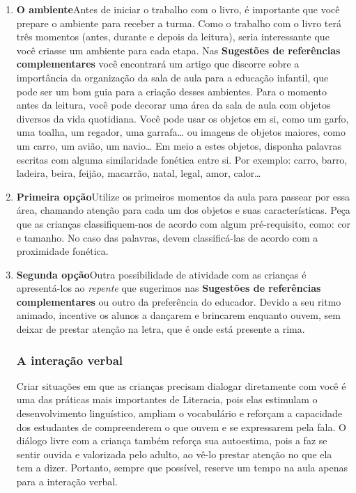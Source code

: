 \documentclass[11pt]{extarticle}
\begin{document}
\begin{enumerate}
\item \textbf{O ambiente}\quad Antes de iniciar o trabalho com o livro, é importante que você 
prepare o ambiente para receber a turma. Como o trabalho com o livro terá 
três momentos (antes, durante e depois da leitura), seria interessante que você 
criasse um ambiente para cada etapa. Nas \textbf{Sugestões de referências complementares} 
você encontrará um artigo que discorre sobre a importância da organização da sala 
de aula para a educação infantil, que pode ser um bom guia para a criação desses 
ambientes. Para o momento antes da leitura, você pode decorar 
uma área da sala de aula com objetos diversos da vida quotidiana.
Você pode usar os objetos em si, como um garfo, uma toalha, 
um regador, uma garrafa\dots{} ou imagens de objetos maiores,
como um carro, um avião, um navio\dots{}
Em meio a estes objetos, disponha palavras escritas com alguma
similaridade fonética entre si. Por exemplo: carro, barro,
ladeira, beira, feijão, macarrão, natal, legal, amor, calor\dots{}

\item \textbf{Primeira opção}\quad Utilize os primeiros 
momentos da aula para passear por essa área, chamando atenção para cada um 
dos objetos e suas características. Peça que as crianças classifiquem-nos de
acordo com algum pré-requisito, como: cor e tamanho. 
No caso das palavras, devem classificá-las de acordo com a 
proximidade fonética. 

\item \textbf{Segunda opção}\quad Outra possibilidade de atividade
com as crianças é apresentá-los ao \emph{repente} que sugerimos
nas \textbf{Sugestões de referências complementares} ou outro
da preferência do educador. Devido a seu ritmo animado,
incentive os alunos a dançarem e brincarem enquanto ouvem,
sem deixar de prestar atenção na letra, que é onde está
presente a rima. 

\subsubsection{A interação verbal} 
Criar situações em que as crianças precisam dialogar diretamente com 
você é uma das práticas mais importantes de Literacia, pois elas estimulam 
o desenvolvimento linguístico, ampliam o vocabulário e reforçam a 
capacidade dos estudantes de compreenderem o que ouvem e se expressarem 
pela fala. O diálogo livre com a criança também reforça sua autoestima, pois 
a faz se sentir ouvida e valorizada pelo adulto, ao vê-lo prestar atenção 
no que ela tem a dizer. Portanto, sempre que possível, reserve um tempo na 
aula apenas para a interação verbal. 


\end{enumerate}
\end{document}
